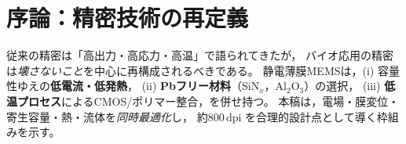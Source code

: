 \section{序論：精密技術の再定義}
従来の精密は「高出力・高応力・高温」で語られてきたが，
バイオ応用の精密は\emph{壊さないこと}を中心に再構成されるべきである。
静電薄膜MEMSは，(i) 容量性ゆえの\textbf{低電流・低発熱}，
(ii) \textbf{Pbフリー材料}（SiN$_x$，Al$_2$O$_3$）の選択，
(iii) \textbf{低温プロセス}によるCMOS/ポリマー整合，を併せ持つ。
本稿は，電場・膜変位・寄生容量・熱・流体を\emph{同時最適化}し，
約800\,dpi を合理的設計点として導く枠組みを示す。
